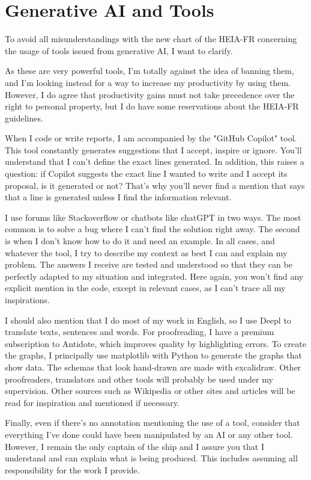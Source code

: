 \chapter{Generative AI and Tools}
\label{ch:tools}

To avoid all misunderstandings with the new chart of the HEIA-FR concerning the
usage of tools issued from generative AI, I want to clarify.

As these are very powerful tools, I'm totally against the idea of banning them,
and I'm looking instead for a way to increase my productivity by using them.
However, I do agree that productivity gains must not take precedence over the
right to personal property, but I do have some reservations about the HEIA-FR
guidelines.

When I code or write reports, I am accompanied by the "GitHub Copilot" tool.
This tool constantly generates suggestions that I accept, inspire or ignore.
You'll understand that I can't define the exact lines
generated.
In addition, this raises a question: if Copilot suggests the exact line I wanted
to write and I accept its proposal, is it generated or not?
That's why you'll never find a mention that says that a line is generated unless
I find the information relevant.

I use forums like Stackoverflow or chatbots like chatGPT in two ways.
The most common is to solve a bug where I can't find the solution right away.
The second is when I don't know how to do it and need an example.
In all cases, and whatever the tool, I try to describe my context as best I can
and explain my problem.
The answers I receive are tested and understood so that they can be perfectly
adapted to my situation and integrated.
Here again, you won't find any explicit mention in the code, except in relevant
cases, as I can't trace all my inspirations.

I should also mention that I do most of my work in English, so I use Deepl to
translate texts, sentences and words.
For proofreading, I have a premium subscription to Antidote, which improves
quality by highlighting errors.
To create the graphs, I principally use matplotlib with Python to generate the
graphs that show data.
The schemas that look hand-drawn are made with excalidraw.
Other proofreaders, translators and other tools will probably be used under my
supervision.
Other sources such as Wikipedia or other sites and articles will be read for
inspiration and mentioned if necessary.

Finally, even if there's no annotation mentioning the use of a tool, consider
that everything I've done could have been manipulated by an AI or any other tool.
However, I remain the only captain of the ship and I assure you that I
understand and can explain what is being produced.
This includes assuming all responsibility for the work I provide.

